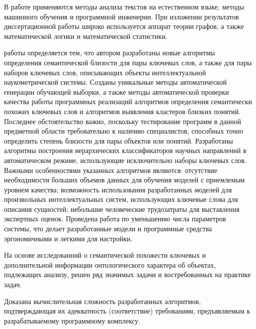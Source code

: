 

В работе применяются методы анализа текстов на естественном языке, методы машинного обучения и программной инженерии. При изложении результатов диссертационной работы широко используется аппарат теории графов, а также математической логики и математической статистики.

{\novelty}
работы определяется тем, что автором разработаны новые алгоритмы определения семантической близости для пары ключевых слов, а также для пары наборов ключевых слов, описывающих объекты интеллектуальной наукометрической системы. Созданы уникальные методы автоматической генерации обучающей выборки, а также методы автоматической проверки качества работы программных реализаций алгоритмов определения семантически похожих ключевых слов и алгоритмов выявления кластеров близких понятий. Последнее обстоятельство важно, поскольку тестирование программ в данной предметной области требовательно к наличию специалистов, способных точно определить степень близости для пары объектов или понятий. Разработаны алгоритмы построения иерархических классификаторов научных направлений в автоматическом режиме, использующие исключительно наборы ключевых слов. Важными особенностями  указанных алгоритмов являются: отсутствие необходимости больших объемов данных для обучения моделей с приемлемым уровнем качества; возможность использования разработанных моделей для произвольных интеллектуальных систем, использующих ключевые слова для описания сущностей; небольшие человеческие трудозатраты для выставления экспертных оценок. Проведена работа по уменьшению числа параметров системы, что делает разработанные модели и программные средства эргономичными и легкими для настройки.

На основе исследованний о семантической похожести ключевых и дополнительной информации онтологического характера об объектах, подлежащих анализу, решен ряд значимых задачи и востребованных на практике задач.

Доказана вычислительная сложность разработанных алгоритмов, подтверждающая их адекватность (соответствие) требованиям, предъявляемым к разрабатываемому программному комплексу.

